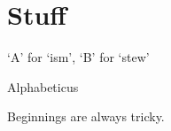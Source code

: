 \documentclass[a4paper,openany]{book}
\begin{document}
%

\mainmatter

\chapter{Stuff}

\epigraph{`A' for `ism', `B' for `stew'}{Alphabeticus}

\begin{multicols}{2}

Beginnings are always tricky.

\end{multicols}
\end{document}
